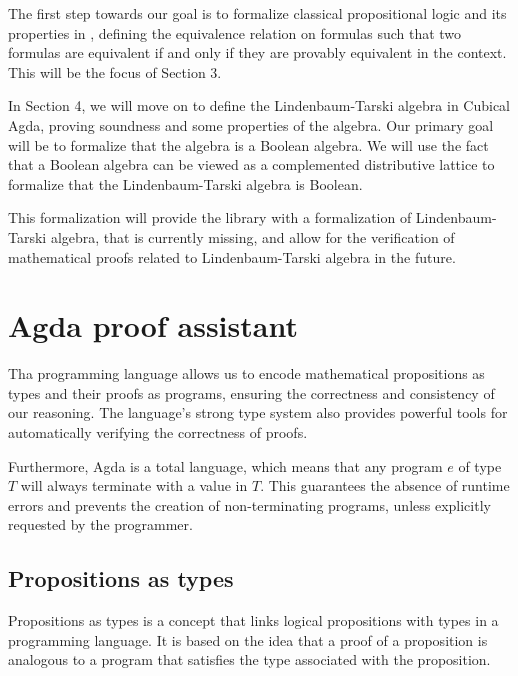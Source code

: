 \documentclass[titlepage]{article}
\begin{document}
The first step towards our goal is to formalize classical propositional logic and its properties in \Agda, defining the equivalence relation on formulas such that two formulas are equivalent if and only if they are provably equivalent in the context. This will be the focus of Section 3.

In Section 4, we will move on to define the Lindenbaum-Tarski algebra in Cubical Agda, proving soundness and some properties of the algebra. Our primary goal will be to formalize that the algebra is a Boolean algebra. We will use the fact that a Boolean algebra can be viewed as a complemented distributive lattice to formalize that the Lindenbaum-Tarski algebra is Boolean.

This formalization will provide the \agdaCubical library with a formalization of Lindenbaum-Tarski algebra, that is currently missing, and allow for the verification of mathematical proofs related to Lindenbaum-Tarski algebra in the future.




\section{Agda proof assistant}

Tha \Agda programming language allows us to encode mathematical propositions as types and their proofs as programs, ensuring the correctness and consistency of our reasoning. The language's strong type system also provides powerful tools for automatically verifying the correctness of proofs.\cite{BoveDybjer2008}

Furthermore, Agda is a total language, which means that any program $e$ of type $T$ will always terminate with a value in $T$. This guarantees the absence of runtime errors and prevents the creation of non-terminating programs, unless explicitly requested by the programmer\cite{AgdaDoc}.


\subsection{Propositions as types}

Propositions as types is a concept that links logical propositions with types in a programming language. It is based on the idea that a proof of a proposition is analogous to a program that satisfies the type associated with the proposition.
\end{document}
